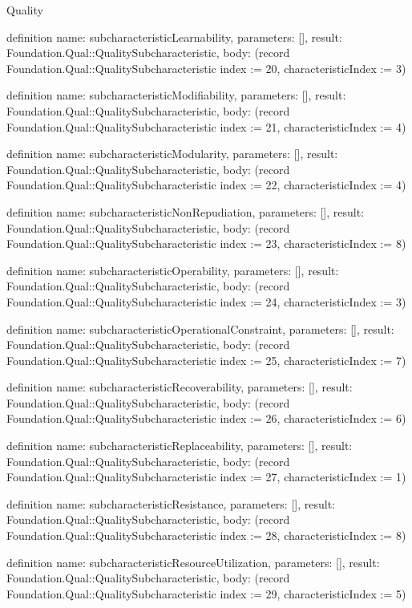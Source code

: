 \begin{lexlean}{Quality}
\begin{semanticmodule}
definition{
  name: subcharacteristicLearnability,
  parameters: [],
  result: Foundation.Qual::QualitySubcharacteristic,
  body: (record Foundation.Qual::QualitySubcharacteristic {index := 20, characteristicIndex := 3})
}

definition{
  name: subcharacteristicModifiability,
  parameters: [],
  result: Foundation.Qual::QualitySubcharacteristic,
  body: (record Foundation.Qual::QualitySubcharacteristic {index := 21, characteristicIndex := 4})
}

definition{
  name: subcharacteristicModularity,
  parameters: [],
  result: Foundation.Qual::QualitySubcharacteristic,
  body: (record Foundation.Qual::QualitySubcharacteristic {index := 22, characteristicIndex := 4})
}

definition{
  name: subcharacteristicNonRepudiation,
  parameters: [],
  result: Foundation.Qual::QualitySubcharacteristic,
  body: (record Foundation.Qual::QualitySubcharacteristic {index := 23, characteristicIndex := 8})
}

definition{
  name: subcharacteristicOperability,
  parameters: [],
  result: Foundation.Qual::QualitySubcharacteristic,
  body: (record Foundation.Qual::QualitySubcharacteristic {index := 24, characteristicIndex := 3})
}

definition{
  name: subcharacteristicOperationalConstraint,
  parameters: [],
  result: Foundation.Qual::QualitySubcharacteristic,
  body: (record Foundation.Qual::QualitySubcharacteristic {index := 25, characteristicIndex := 7})
}

definition{
  name: subcharacteristicRecoverability,
  parameters: [],
  result: Foundation.Qual::QualitySubcharacteristic,
  body: (record Foundation.Qual::QualitySubcharacteristic {index := 26, characteristicIndex := 6})
}

definition{
  name: subcharacteristicReplaceability,
  parameters: [],
  result: Foundation.Qual::QualitySubcharacteristic,
  body: (record Foundation.Qual::QualitySubcharacteristic {index := 27, characteristicIndex := 1})
}

definition{
  name: subcharacteristicResistance,
  parameters: [],
  result: Foundation.Qual::QualitySubcharacteristic,
  body: (record Foundation.Qual::QualitySubcharacteristic {index := 28, characteristicIndex := 8})
}

definition{
  name: subcharacteristicResourceUtilization,
  parameters: [],
  result: Foundation.Qual::QualitySubcharacteristic,
  body: (record Foundation.Qual::QualitySubcharacteristic {index := 29, characteristicIndex := 5})
}


\end{semanticmodule}
\end{lexlean}

